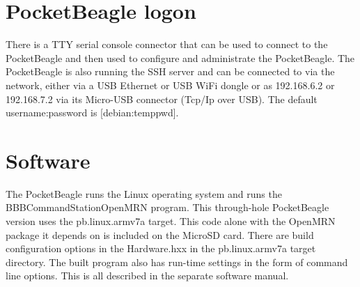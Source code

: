 \section{PocketBeagle logon}

There is a TTY serial console connector that can be used to connect to the 
PocketBeagle and then used to configure and administrate the PocketBeagle. The 
PocketBeagle is also running the SSH server and can be connected to via the 
network, either via a  USB Ethernet or USB WiFi dongle or as 192.168.6.2 or 
192.168.7.2 via its Micro-USB connector (Tcp/Ip over USB).  The default 
username:password is [debian:temppwd].

\section{Software}

The PocketBeagle runs the Linux operating system and runs the 
BBBCommandStationOpenMRN program. This through-hole PocketBeagle version uses 
the pb.linux.armv7a target.  This code alone with the OpenMRN package it 
depends on is included on the MicroSD card.  There are build configuration 
options in the Hardware.hxx in the pb.linux.armv7a target directory.  The 
built program also has run-time settings in the form of command line options. 
This is all described in the separate software manual. 

